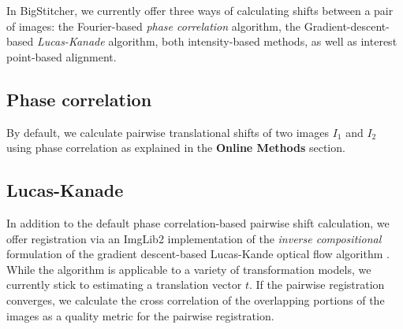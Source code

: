 In BigStitcher, we currently offer three ways of calculating shifts between a pair of images: the Fourier-based \emph{phase correlation} algorithm, the Gradient-descent-based \emph{Lucas-Kanade} algorithm, both intensity-based methods, as well as interest point-based alignment.

\subsection*{Phase correlation}

By default, we calculate pairwise translational shifts of two images $I_1$ and $I_2$ using phase correlation as explained in the \textbf{Online Methods} section.

%

\subsection*{Lucas-Kanade}

In addition to the default phase correlation-based pairwise shift calculation, we offer registration via an ImgLib2 implementation of the \emph{inverse compositional} formulation of the gradient descent-based Lucas-Kande optical flow algorithm \cite{baker2004lucas}. While the algorithm is applicable to a variety of transformation models, we currently stick to estimating a translation vector $t$. If the pairwise registration converges, we calculate the cross correlation of the overlapping portions of the images as a quality metric for the pairwise registration. 

